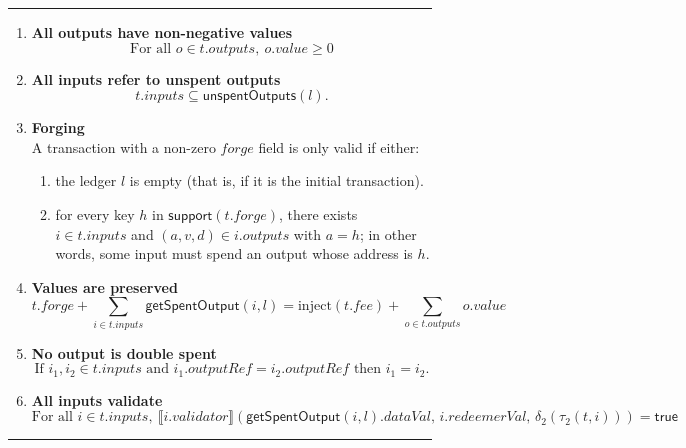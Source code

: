 \documentclass[a4paper]{article}
\newcommand{\msf}[1]{\ensuremath{\mathsf{#1}}}
\newcommand{\mi}[1]{\ensuremath{\mathit{#1}}}
\newcommand\rfskip{7pt}
\newenvironment{ruledfigure}[1]{\begin{figure}[#1]\hrule\vspace{\rfskip}}{\vspace{\rfskip}\hrule\end{figure}}
\newcommand{\true}{\textsf{true}}
\newcommand{\support}{\msf{support}}
\newcommand{\inputs}{\mi{inputs}}
\newcommand{\outputs}{\mi{outputs}}
\newcommand{\forge}{\mi{forge}}
\newcommand{\fee}{\mi{fee}}
\newcommand{\val}{\mi{value}}  %
\newcommand{\validator}{\mi{validator}}
\newcommand{\redeemerval}{\mi{redeemerVal}}
\newcommand{\dataval}{\mi{dataVal}}
\newcommand{\outputref}{\mi{outputRef}}
\newcommand{\getSpent}{\msf{getSpentOutput}}
\newcommand{\unspent}{\msf{unspentOutputs}}
\newcommand{\injectNative}{\ensuremath{\mathrm{inject}}}
\begin{document}
\begin{ruledfigure}{H}
\begin{enumerate}

\item
  \label{rule:all-outputs-are-non-negative-2}
  \textbf{All outputs have non-negative values}
  \begin{displaymath}
    \textrm{For all } o \in t.\outputs,\ o.\val \geq 0
  \end{displaymath}

\item
  \label{rule:all-inputs-refer-to-unspent-outputs-2}
  \textbf{All inputs refer to unspent outputs}
  \begin{displaymath}
    t.\inputs \subseteq \unspent(l).
  \end{displaymath}

\item
  \label{rule:forging-2}
  \textbf{Forging}\\
  A transaction with a non-zero \forge{} field is only
  valid if either:
  \begin{enumerate}
    \item the ledger $l$ is empty (that is, if it is the initial transaction).
    \item \label{rule:custom-forge}
      for every key $h$ in $\support(t.\forge)$, there
      exists $i \in t.\inputs$ and $(a,v,d) \in i.\outputs$ with
      $a =h$; in other words, some input must spend an output
      whose address is $h$.
  \end{enumerate}

\item
  \label{rule:value-is-preserved-2}
  \textbf{Values are preserved}
  \begin{displaymath}
    t.\forge + \sum_{i \in t.\inputs} \getSpent(i, l) = \injectNative(t.\fee) + \sum_{o \in t.\outputs} o.\val
  \end{displaymath}

\item
  \label{rule:no-double-spending-2}
  \textbf{No output is double spent}
  \begin{displaymath}
    \textrm{If } i_1, i_2 \in t.\inputs \textrm{ and }  i_1.\outputref = i_2.\outputref
    \textrm{ then } i_1 = i_2.
  \end{displaymath}

\item
  \label{rule:all-inputs-validate-2}
  \textbf{All inputs validate}
  \begin{displaymath}
    \textrm{For all } i \in t.\inputs,\ \llbracket
    i.\validator\rrbracket(\getSpent(i,l).\dataval,\, i.\redeemerval,\, \delta_2(\tau_2(t, i))) = \true
  \end{displaymath}


\end{enumerate}
\end{ruledfigure}
\end{document}
